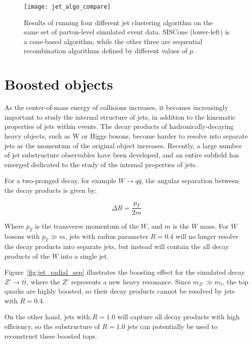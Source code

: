 \begin{figure}[!ht]
    \centering
\texttt{[image: jet\_algo\_compare]}
\caption{Results of running four different jet clustering algorithm on the same set of parton-level simulated event data.
SISCone (lower-left) is a cone-based algorithm, while the other three are sequential recombination algorithms defined
by different values of $p$.}
\label{fig:jet_algo_compare}
\end{figure}\cite{jet-antikt-algo}

\section{Boosted objects}\label{sec:jet_substructure}

As the center-of-mass energy of collisions increases, it becomes increasingly important to study the internal structure
of jets, in addition to the kinematic properties of jets within events.
The decay products of hadronically-decaying heavy objects, such as W or Higgs bosons,
become harder to resolve into separate jets as the momentum of the original object increases.
Recently, a large number of jet substructure observables have been developed, and an entire subfield has emerged
dedicated to the study of the internal properties of jets.

For a two-pronged decay, for example $W \rightarrow q\bar{q}$, the angular separation between the decay products is given by:

\begin{equation}\label{eq:jet_boosted_sep}
    \Delta R = \frac{p_{T}}{2m}
\end{equation}

Where $p_T$ is the transverse momentum of the $W$, and $m$ is the $W$ mass.
For $W$ bosons with $p_T \gg m$, jets with radius parameter $R = 0.4$ will no longer resolve the decay products into separate jets,
but instead will contain the all decay products of the $W$ into a single jet.

Figure~\ref{fig:jet_radial_sep} illustrates the boosting effect for the simulated decay $Z'\rightarrow t\bar{t}$,
where the $Z'$ represents a new heavy resonance.
Since $m_{Z'} \gg m_{t}$, the top quarks are highly boosted, so their decay products cannot be resolved by jets with $R=0.4$.

On the other hand, jets with $R = 1.0$ will capture all decay products with high efficiency,
so the substructure of $R=1.0$ jets can potentially be used to reconstruct these boosted tops.

